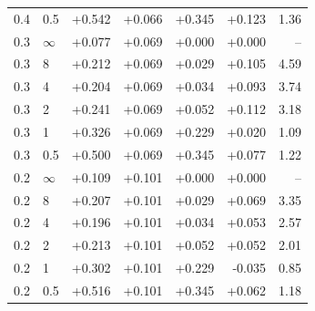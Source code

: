\begin{tabular}{@{}llrrrrr@{}}
0.4 & 0.5 & +0.542 & +0.066 & +0.345 & +0.123 & 1.36 \\
0.3 & $\infty$ & +0.077 & +0.069 & +0.000 & +0.000 & -- \\
0.3 & 8 & +0.212 & +0.069 & +0.029 & +0.105 & 4.59 \\
0.3 & 4 & +0.204 & +0.069 & +0.034 & +0.093 & 3.74 \\
0.3 & 2 & +0.241 & +0.069 & +0.052 & +0.112 & 3.18 \\
0.3 & 1 & +0.326 & +0.069 & +0.229 & +0.020 & 1.09 \\
0.3 & 0.5 & +0.500 & +0.069 & +0.345 & +0.077 & 1.22 \\
0.2 & $\infty$ & +0.109 & +0.101 & +0.000 & +0.000 & -- \\
0.2 & 8 & +0.207 & +0.101 & +0.029 & +0.069 & 3.35 \\
0.2 & 4 & +0.196 & +0.101 & +0.034 & +0.053 & 2.57 \\
0.2 & 2 & +0.213 & +0.101 & +0.052 & +0.052 & 2.01 \\
0.2 & 1 & +0.302 & +0.101 & +0.229 & -0.035 & 0.85 \\
0.2 & 0.5 & +0.516 & +0.101 & +0.345 & +0.062 & 1.18 \\
\bottomrule
\end{tabular}
